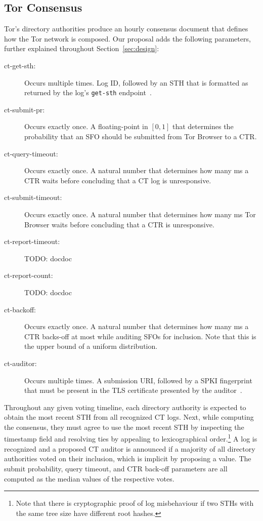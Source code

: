 \subsection{Tor Consensus}
Tor's directory authorities produce an hourly consensus document that defines
how the Tor network is composed.  Our proposal adds the following parameters,
further explained throughout Section~\ref{sec:design}:
\begin{description}
	\item[ct-get-sth:] Occurs multiple times.  Log ID, followed by an STH that is
		formatted as returned by the log's \texttt{get-sth}
		endpoint~\cite{ct,ct/bis}.
	\item[ct-submit-pr:] Occurs exactly once.  A floating-point in $[0,1]$
		that determines the probability that an SFO should be submitted from Tor
		Browser to a CTR.
	\item[ct-query-timeout:] Occurs exactly once.  A natural number that
		determines how many ms a CTR waits before concluding that a CT log is
		unresponsive.
	\item[ct-submit-timeout:] Occurs exactly once.  A natural number that
		determines how many ms Tor Browser waits before concluding that a CTR
		is unresponsive.
	\item[ct-report-timeout:] TODO: docdoc
	\item[ct-report-count:] TODO: docdoc
	\item[ct-backoff:] Occurs exactly once.  A natural number that determines
		how many ms a CTR backs-off at most while auditing SFOs for inclusion.
		Note that this is the upper bound of a uniform distribution.
	\item[ct-auditor:] Occurs multiple times.  A submission URI, followed by a
		SPKI fingerprint that must be present in the TLS certificate presented
		by the auditor~\cite{hpkp}.
\end{description}

Throughout any given voting timeline, each directory authority is expected to
obtain the most recent STH from all recognized CT logs.  Next, while computing
the consensus, they must agree to use the most recent STH by inspecting the
timestamp field and resolving ties by appealing to lexicographical
order.\footnote{%
	Note that there is cryptographic proof of log misbehaviour if two STHs with
	the same tree size have different root hashes.
}  A log is recognized and a proposed CT auditor is announced if a majority of
all directory authorities voted on their inclusion, which is implicit by
proposing a value.  The submit probability, query timeout, and CTR back-off
parameters are all computed as the median values of the respective votes.

